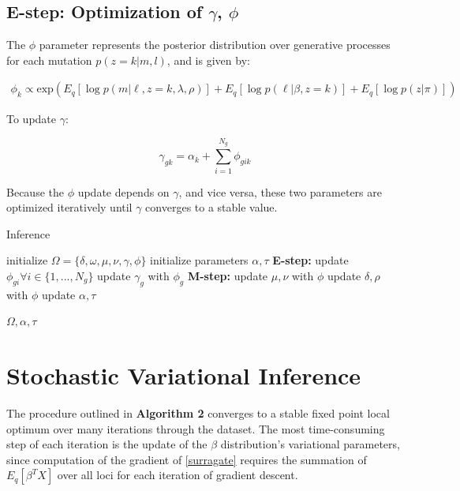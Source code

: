 \documentclass{article}
\begin{document}
\subsection{E-step: Optimization of $\gamma$, $\phi$}

The $\phi$ parameter represents the posterior distribution over generative processes for each mutation $p(z=k | m, l)$, and is given by:

\begin{equation}
\begin{split}
\phi_k \propto \textrm{exp} \left( E_q[\log p(m|\ell,z=k,\lambda,\rho)] + E_q[\log p(\ell|\beta, z=k)] + E_q [\log p(z | \pi ) ] \right)
\end{split}
\end{equation}

To update $\gamma$:

\begin{equation}
\gamma_{gk} = \alpha_k + \sum_{i=1}^{N_g} \phi_{gik}
\end{equation}

Because the $\phi$ update depends on $\gamma$, and vice versa, these two parameters are optimized iteratively until $\gamma$ converges to a stable value.


\begin{algorithm} \label{Inference}
\caption{Inference}
\begin{algorithmic}
  \scriptsize
  \STATE initialize $\Omega = \{\delta, \omega, \mu, \nu, \gamma, \phi\}$
  \STATE initialize parameters $\alpha, \tau$
  	\STATE \textbf{E-step:}
  			\STATE update $\phi_{gi} \forall i \in \{1, ..., N_g\}$
  			\STATE update $\gamma_g$ with $\phi_g$
  		\ENDWHILE
  	\ENDFOR
  	\STATE \textbf{M-step:}
  	\STATE update $\mu,\nu$ with $\phi$
  	\STATE update $\delta, \rho$ with $\phi$
  		\STATE update $\alpha, \tau$
  	\ENDIF
  \ENDWHILE
  
  \RETURN $\Omega, \alpha, \tau$
\end{algorithmic}
\end{algorithm}


\section{Stochastic Variational Inference}

The procedure outlined in \textbf{Algorithm 2} converges to a stable fixed point local optimum over many iterations through the dataset. The most time-consuming step of each iteration  is the update of the $\beta$ distribution's variational parameters, since computation of the gradient of \eqref{surragate} requires the summation of $E_q[\beta^T X]$ over all loci for each iteration of gradient descent. 
\end{document}
